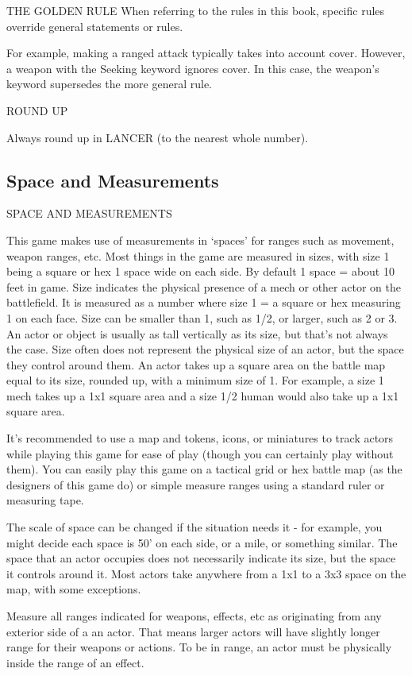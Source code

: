                                           THE GOLDEN RULE  
When referring to the rules in this book, specific rules override general statements or rules. 
 

For example, making a ranged attack typically takes into account cover. However, a weapon with  
the Seeking keyword ignores cover. In this case, the weapon’s keyword supersedes the more  
general rule.  

                                                 ROUND UP  

                                                                                                              


Always round up in LANCER (to the nearest whole number).  
\subsection{Space and Measurements}
                                 SPACE AND MEASUREMENTS  

This game makes use of measurements in ‘spaces’ for ranges such as movement, weapon  
ranges, etc. Most things in the game are measured in sizes, with size 1 being a square or hex 1  
space wide on each side. By default 1 space = about 10 feet in game. Size indicates the physical  
presence of a mech or other actor on the battlefield. It is measured as a number where size 1 = a  
square or hex measuring 1 on each face. Size can be smaller than 1, such as 1/2, or larger, such  
as 2 or 3. An actor or object is usually as tall vertically as its size, but that’s not always the case.  
Size often does not represent the physical size of an actor, but the space they control around  
them. An actor takes up a square area on the battle map equal to its size, rounded up, with a  
minimum size of 1. For example, a size 1 mech takes up a 1x1 square area and a size 1/2 human  
would also take up a 1x1 square area.  

It’s recommended to use a map and tokens, icons, or miniatures to track actors while playing this  
game for ease of play (though you can certainly play without them). You can easily play this game  
on a tactical grid or hex battle map (as the designers of this game do) or simple measure ranges  
using a standard ruler or measuring tape.  

The scale of space can be changed if the situation needs it - for example, you might decide each  
space is 50’ on each side, or a mile, or something similar. The space that an actor occupies does  
not necessarily indicate its size, but the space it controls around it. Most actors take anywhere  
from a 1x1 to a 3x3 space on the map, with some exceptions.
 

Measure all ranges indicated for weapons, effects, etc as originating from any exterior side of a  
an actor. That means larger actors will have slightly longer range for their weapons or actions. To  
be in range, an actor must be physically inside the range of an effect.
 
